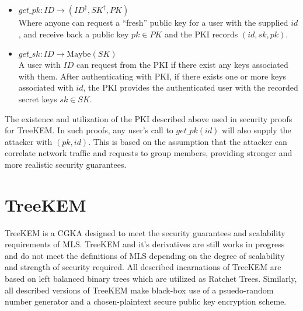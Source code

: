 \documentclass[12pt,twocolumn]{article}
\begin{document}
	\begin{itemize}
		
		\item $get\_pk : ID \to (ID^\dagger, SK^\dagger, PK)$\\
		Where anyone can request a ``fresh'' public key for a user with the supplied $id$, and receive back a public key $pk \in PK$ and the PKI records $(id, sk, pk)$.
		
		\item $get\_sk : ID \to \text{Maybe}(SK)$\\
		A user with $ID$ can request from the PKI if there exist any keys associated with them.
		After authenticating with PKI, if there exists one or more keys associated with $id$, the PKI provides the authenticated user with the recorded secret keys $sk \in SK$.

	\end{itemize}

	The existence and utilization of the PKI described above used in security proofs for TreeKEM.
	In such proofs, any user's call to $get\_pk(id)$ will also supply the attacker with $(pk, id)$.
	This is based on the assumption that the attacker can correlate network traffic and requests to group members, providing stronger and more realistic security guarantees.
	
	
	\section*{TreeKEM}
	
	TreeKEM is a CGKA designed to meet the security guarantees and scalability requirements of MLS.
	TreeKEM and it's derivatives are still works in progress and do not meet the definitions of MLS depending on the degree of scalability and strength of security required.
	All described incarnations of TreeKEM are based on left balanced binary trees which are utilized as Ratchet Trees.
	Similarly, all described versions of TreeKEM make black-box use of a psuedo-random number generator and a chosen-plaintext secure public key encryption scheme.
	
\end{document}
